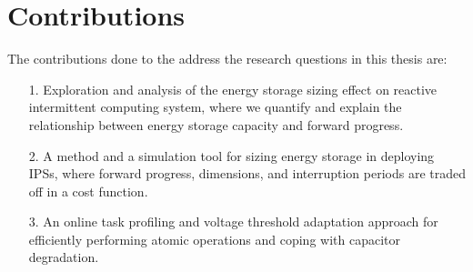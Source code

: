 \begin{enumerate}
  
\end{enumerate}

\section{Contributions}


The contributions done to the address the research questions in this thesis are:
\begin{itemize}
  \item[1.] Exploration and analysis of the energy storage sizing effect on reactive intermittent computing system, where we quantify and explain the relationship between energy storage capacity and forward progress.
  \item[2.] A method and a simulation tool for sizing energy storage in deploying IPSs, where forward progress, dimensions, and interruption periods are traded off in a cost function.
  \item[3.] An online task profiling and voltage threshold adaptation approach for efficiently performing atomic operations and coping with capacitor degradation. 
\end{itemize}


